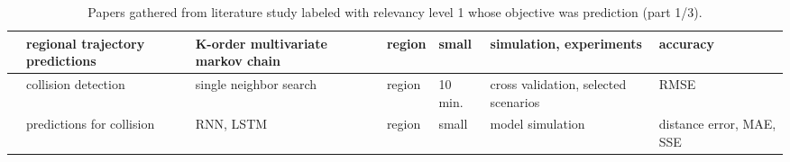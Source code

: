 \begin{table}[htbp]
{\begin{tabularx}{1.2\textwidth}{p{0.6in} X X p{0.5in} p{0.4in} X p{0.5in}}
    \cite{Guo2018TrajectoryChain} & regional trajectory predictions & K-order multivariate markov chain & region & small & simulation, experiments & accuracy \\ \midrule
    \cite{Hexeberg2017AIS-basedPrediction} & collision detection & single neighbor search & region & 10 min. & cross validation, selected scenarios & RMSE \\
    \midrule
    \cite{Jin2020MaritimeNetwork} & predictions for collision & RNN, LSTM & region & small & model simulation & distance error, MAE, SSE \\ \midrule
\end{tabularx}}
\caption{Papers gathered from literature study labeled with relevancy level 1 whose objective was prediction (part 1/3).}
\label{tab:lit_review_cat_1_1}
\end{table}

